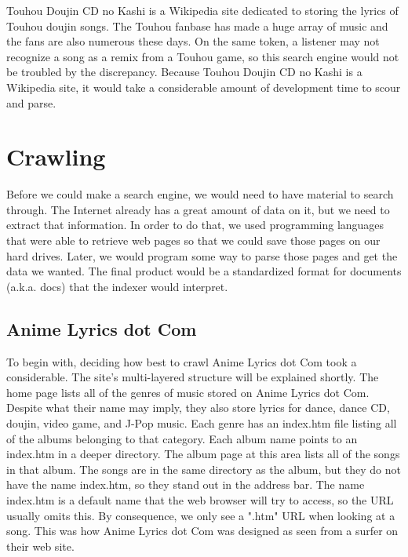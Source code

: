 \documentclass{acm} %
\begin{document}
\begin{CJK}{UTF8}{zhsong}
Touhou Doujin CD no Kashi is a Wikipedia site dedicated to storing the lyrics of Touhou doujin songs. The Touhou fanbase has made a huge array of music and the fans are also numerous these days. On the same token, a listener may not recognize a song as a remix from a Touhou game, so this search engine would not be troubled by the discrepancy. Because Touhou Doujin CD no Kashi is a Wikipedia site, it would take a considerable amount of development time to scour and parse.

\section{Crawling}

Before we could make a search engine, we would need to have material to search through. The Internet already has a great amount of data on it, but we need to extract that information. In order to do that, we used programming languages that were able to retrieve web pages so that we could save those pages on our hard drives. Later, we would program some way to parse those pages and get the data we wanted. The final product would be a standardized format for documents (a.k.a. docs) that the indexer would interpret.

\subsection{Anime Lyrics dot Com}


To begin with, deciding how best to crawl Anime Lyrics dot Com took a considerable. The site's multi-layered structure will be explained shortly. The home page lists all of the genres of music stored on Anime Lyrics dot Com. Despite what their name may imply, they also store lyrics for dance, dance CD, doujin, video game, and J-Pop music. Each genre has an index.htm file listing all of the albums belonging to that category. Each album name points to an index.htm in a deeper directory. The album page at this area lists all of the songs in that album. The songs are in the same directory as the album, but they do not have the name index.htm, so they stand out in the address bar. The name index.htm is a default name that the web browser will try to access, so the URL usually omits this. By consequence, we only see a ".htm" URL when looking at a song. This was how Anime Lyrics dot Com was designed as seen from a surfer on their web site.


\end{CJK}
\end{document}
